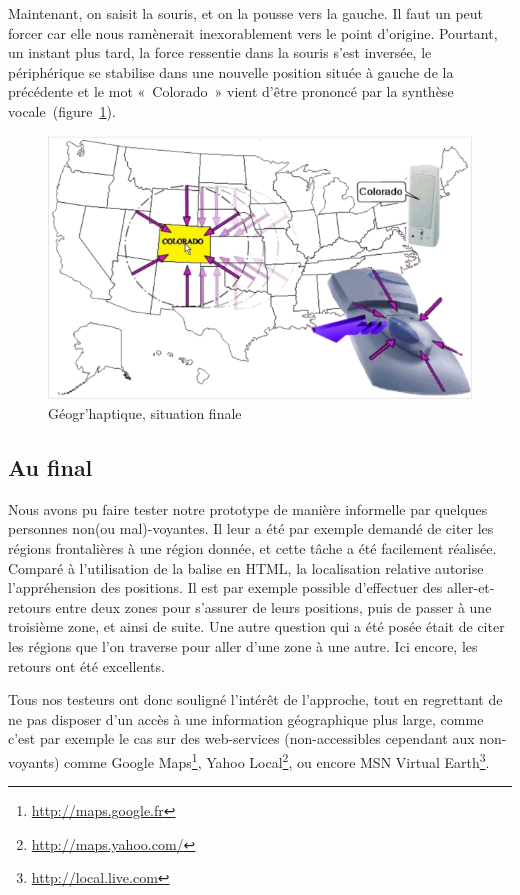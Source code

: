 \documentclass[
]{book}
\begin{document}
Maintenant, on saisit la souris, et on la pousse vers la gauche. Il faut
un peut forcer car elle nous ramènerait inexorablement vers le point
d'origine. Pourtant, un instant plus tard, la force ressentie dans la souris
s'est inversée, le périphérique se stabilise dans une nouvelle position
située à gauche de la précédente et le mot «~Colorado~» vient
d'être prononcé par la synthèse vocale~(figure~\ref{fig:finale}).

\begin{figure}
\centering
\includegraphics{img/geo2.png}
\caption{\label{fig:finale}Géogr'haptique, situation finale}
\end{figure}

\hypertarget{au-final}{%
\subsection{Au final}\label{au-final}}

Nous avons pu faire tester notre prototype de manière informelle par
quelques personnes non(ou mal)-voyantes. Il leur a été par exemple demandé de
citer les régions frontalières à une région donnée, et cette tâche a été
facilement réalisée. Comparé à l'utilisation de la balise en
HTML, la localisation relative autorise l'appréhension des positions. Il est
par exemple possible d'effectuer des aller-et-retours entre deux zones pour
s'assurer de leurs positions, puis de passer à une troisième zone, et ainsi
de suite. Une autre question qui a été posée était de citer les régions que
l'on traverse pour aller d'une zone à une autre. Ici encore, les retours ont
été excellents.

Tous nos testeurs ont donc souligné l'intérêt de l'approche, tout en
regrettant de ne pas disposer d'un accès à une information géographique plus
large, comme c'est par exemple le cas sur des web-services (non-accessibles
cependant aux non-voyants) comme Google Maps\footnote{\url{http://maps.google.fr}},
Yahoo Local\footnote{\url{http://maps.yahoo.com/}}, ou encore MSN
Virtual Earth\footnote{\url{http://local.live.com}}.
\end{document}
